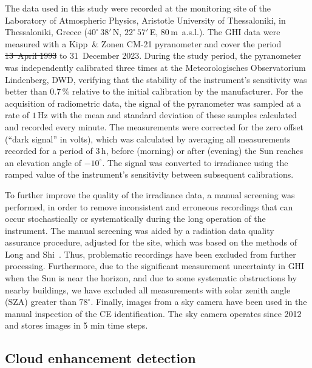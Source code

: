 \documentclass[preprint, 5p,
authoryear]{elsarticle} %
\providecommand{\DIFaddtex}[1]{{\protect\color{blue}\uwave{#1}}} %
\providecommand{\DIFdeltex}[1]{{\protect\color{red}\sout{#1}}}                      %
\providecommand{\DIFaddbegin}{} %
\providecommand{\DIFaddend}{} %
\providecommand{\DIFdelbegin}{} %
\providecommand{\DIFdelend}{} %
\providecommand{\DIFadd}[1]{\texorpdfstring{\DIFaddtex{#1}}{#1}} %
\providecommand{\DIFdel}[1]{\texorpdfstring{\DIFdeltex{#1}}{}} %
\newcommand{\DIFscaledelfig}{0.5}
\newlength{\DIFdelgraphicswidth} %
\newlength{\DIFdelgraphicsheight} %
\newcommand{\DIFaddincludegraphics}[2][]{{\color{blue}\fbox{\DIFOincludegraphics[#1]{#2}}}} %
\newcommand{\DIFdelincludegraphics}[2][]{%
\sbox{\DIFdelgraphicsbox}{\DIFOincludegraphics[#1]{#2}}%
\settoboxwidth{\DIFdelgraphicswidth}{\DIFdelgraphicsbox} %
\settoboxtotalheight{\DIFdelgraphicsheight}{\DIFdelgraphicsbox} %
\scalebox{\DIFscaledelfig}{%
\parbox[b]{\DIFdelgraphicswidth}{\usebox{\DIFdelgraphicsbox}\\[-\baselineskip] \rule{\DIFdelgraphicswidth}{0em}}\llap{\resizebox{\DIFdelgraphicswidth}{\DIFdelgraphicsheight}{%
\setlength{\unitlength}{\DIFdelgraphicswidth}%
\begin{picture}(1,1)%
\thicklines\linethickness{2pt} %
{\color[rgb]{1,0,0}\put(0,0){\framebox(1,1){}}}%
{\color[rgb]{1,0,0}\put(0,0){\line( 1,1){1}}}%
{\color[rgb]{1,0,0}\put(0,1){\line(1,-1){1}}}%
\end{picture}%
}\hspace*{3pt}}} %
} %
\DeclareRobustCommand{\DIFaddbegin}{\DIFOaddbegin \let\includegraphics\DIFaddincludegraphics} %
\DeclareRobustCommand{\DIFaddend}{\DIFOaddend \let\includegraphics\DIFOincludegraphics} %
\DeclareRobustCommand{\DIFdelbegin}{\DIFOdelbegin \let\includegraphics\DIFdelincludegraphics} %
\DeclareRobustCommand{\DIFdelend}{\DIFOaddend \let\includegraphics\DIFOincludegraphics} %
\begin{document}
The data used in this study were recorded at the monitoring site of the
Laboratory of Atmospheric Physics, Aristotle University of Thessaloniki,
in Thessaloniki, Greece (\(40^\circ\,38'\,\)N, \(22^\circ\,57'\,\)E,
\(80\,\)m~a.s.l.). The GHI data were measured with a Kipp~\& Zonen CM-21
pyranometer and cover the period \DIFdelbegin \DIFdel{13~April 1993 }\DIFdelend \DIFaddbegin \DIFadd{01~January 1994 }\DIFaddend to 31~December 2023.
During the study period, the pyranometer was independently calibrated
three times at the Meteorologisches Observatorium Lindenberg, DWD,
verifying that the stability of the instrument's sensitivity was better
than \(0.7\,\%\) relative to the initial calibration by the
manufacturer. For the acquisition of radiometric data, the signal of the
pyranometer was sampled at a rate of \(1\,\text{Hz}\) with the mean and
standard deviation of these samples calculated and recorded every
minute. The measurements were corrected for the zero offset (``dark
signal'' in volts), which was calculated by averaging all measurements
recorded for a period of \(3\,\text{h}\), before (morning) or after
(evening) the Sun reaches an elevation angle of \(-10^\circ\). The
signal was converted to irradiance using the ramped value of the
instrument's sensitivity between subsequent calibrations.

To further improve the quality of the irradiance data, a manual
screening was performed, in order to remove inconsistent and erroneous
recordings that can occur stochastically or systematically during the
long operation of the instrument. The manual screening was aided by a
radiation data quality assurance procedure, adjusted for the site, which
was based on the methods of Long and Shi~\citep{Long2006, Long2008a}.
Thus, problematic recordings have been excluded from further processing.
Furthermore, due to the significant measurement uncertainty in GHI when
the Sun is near the horizon, and due to some systematic obstructions by
nearby buildings, we have excluded all measurements with solar zenith
angle (SZA) greater than \(78^\circ\). Finally, images from a sky camera
have been used in the manual inspection of the CE identification. The
sky camera operates since 2012 and stores images in 5 min time steps.

\hypertarget{cloud-enhancement-detection}{%
\subsection{Cloud enhancement
detection}\label{cloud-enhancement-detection}}
\end{document}
